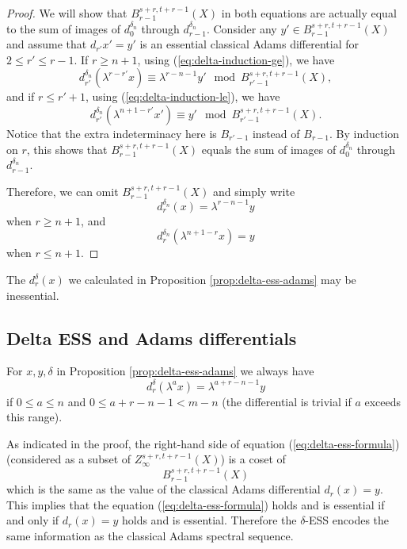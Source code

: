 \begin{proof}
    We will show that
    $B_{r-1}^{s+r,t+r-1}(X)$ in both equations are actually equal to the sum of images of $d^{\delta_{n}}_0$ through $d^{\delta_{n}}_{r-1}$.
    Consider any $y'\in B_{r-1}^{s+r,t+r-1}(X)$ and assume that $d_{r'}x'=y'$ is an essential classical Adams differential for $2\le r'\le r-1$. If $r\ge n+1$, using (\ref{eq:delta-induction-ge}), we have
    $$d^{\delta_n}_{r'}(\lambda^{r-r'}x)\equiv \lambda^{r-n-1}y'\mod B_{r'-1}^{s+r,t+r-1}(X),$$
    and if $r\leq r'+1$, using (\ref{eq:delta-induction-le}), we have
    $$d^{\delta_n}_{r'}(\lambda^{n+1-r'}x')\equiv y'\mod B_{r'-1}^{s+r,t+r-1}(X).$$
    Notice that the extra indeterminacy here is $B_{r'-1}$ instead of $B_{r-1}$. By induction on $r$, this shows that $B_{r-1}^{s+r,t+r-1}(X)$ equals the sum of images of $d^{\delta_{n}}_0$ through $d^{\delta_{n}}_{r-1}$.
    
    Therefore, we can omit $B_{r-1}^{s+r,t+r-1}(X)$ and simply write
    $$d^{\delta_n}_r(x)= \lambda^{r-n-1}y$$
    when $r\ge n+1$, and
    $$d^{\delta_n}_r(\lambda^{n+1-r}x)= y$$
    when $r\le n+1$.
\end{proof}

\begin{remark}
    The $d^{\delta}_r(x)$ we calculated in Proposition \ref{prop:delta-ess-adams} may be inessential.
\end{remark}


\subsection{Delta ESS and Adams differentials}

\begin{corollary}\label{cor:delta-ess-general}
    For $x,y,\delta$ in Proposition \ref{prop:delta-ess-adams} we always have
    \begin{equation}\label{eq:delta-ess-formula}
        d^{\delta}_r(\lambda^ax)=\lambda^{a+r-n-1}y
    \end{equation}
    if $0\le a\le n$ and $0\le a+r-n-1<m-n$ (the differential is trivial if $a$ exceeds this range).
\end{corollary}

\begin{remark}\label{rmk:delta-ess-equiv-classical}
    As indicated in the proof, the right-hand side of equation (\ref{eq:delta-ess-formula}) (considered as a subset of $Z_\infty^{s+r,t+r-1}(X)$) is a coset of
    $$B_{r-1}^{s+r,t+r-1}(X)$$
    which is the same as the value of the classical Adams differential $d_r(x)=y$. This implies that the equation (\ref{eq:delta-ess-formula}) holds and is essential if and only if $d_r(x)=y$ holds and is essential. Therefore the $\delta$-ESS encodes the same information as the classical Adams spectral sequence.
\end{remark}

